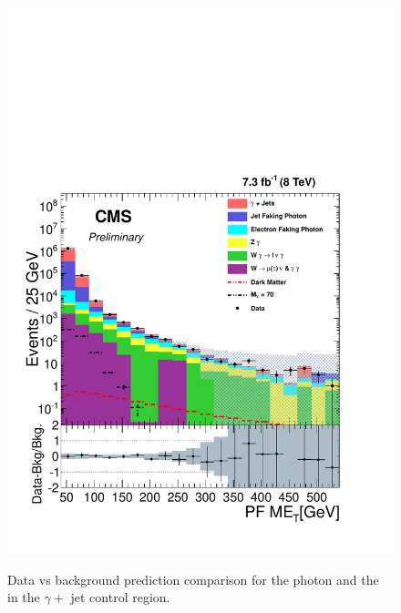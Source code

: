 \begin{figure}[!hp]
{\includegraphics[scale=0.4]{analysis_figs/QCD_met.pdf}}
\caption{Data vs background prediction comparison for the photon \pt and the \met in the $\gamma +$ jet control region.}
\label{fig:pg_CR}
\end{figure}

